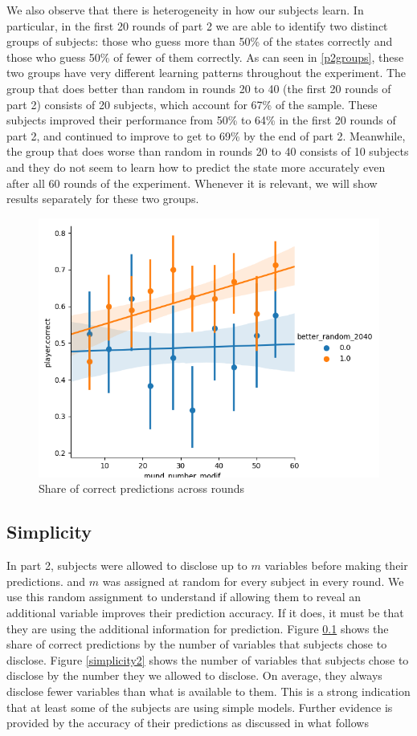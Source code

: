 \documentclass[
  12pt,
]{article}
\begin{document}
We also observe that there is heterogeneity in how our subjects learn.
In particular, in the first 20 rounds of part 2 we are able to identify
two distinct groups of subjects: those who guess more than 50\% of the
states correctly and those who guess 50\% of fewer of them correctly. As
can seen in \ref{p2groups}, these two groups have very different
learning patterns throughout the experiment. The group that does better
than random in rounds 20 to 40 (the first 20 rounds of part 2) consists
of 20 subjects, which account for 67\% of the sample. These subjects
improved their performance from 50\% to 64\% in the first 20 rounds of
part 2, and continued to improve to get to 69\% by the end of part 2.
Meanwhile, the group that does worse than random in rounds 20 to 40
consists of 10 subjects and they do not seem to learn how to predict the
state more accurately even after all 60 rounds of the experiment.
Whenever it is relevant, we will show results separately for these two
groups.

\begin{figure}

{\centering \includegraphics[width=0.65\linewidth]{../computed_objects/figures/p2_correct_rounds} 

}

\caption{\label{p2groups} Share of correct predictions across rounds}\label{fig:p2groups}
\end{figure}

\hypertarget{simplicity}{%
\subsection{Simplicity}\label{simplicity}}

In part 2, subjects were allowed to disclose up to \(m\) variables
before making their predictions. and \(m\) was assigned at random for
every subject in every round. We use this random assignment to
understand if allowing them to reveal an additional variable improves
their prediction accuracy. If it does, it must be that they are using
the additional information for prediction. Figure \ref{simplicity} shows
the share of correct predictions by the number of variables that
subjects chose to disclose. Figure \ref{simplicity2} shows the number of
variables that subjects chose to disclose by the number they we allowed
to disclose. On average, they always disclose fewer variables than what
is available to them. This is a strong indication that at least some of
the subjects are using simple models. Further evidence is provided by
the accuracy of their predictions as discussed in what follows
\end{document}
